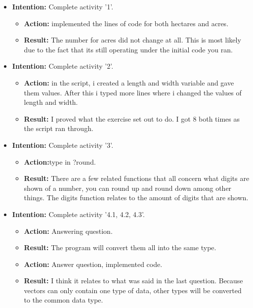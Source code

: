 \documentclass{article}
\begin{document}
\begin{itemize}
\item{\textbf{Intention:} Complete activity '1'.}

\begin{itemize}
\item{\textbf{Action:} implemented the lines of code for both hectares and acres.}
\item{\textbf{Result:} The number for acres did not change at all. This is most likely due to the fact that its still operating under the initial code you ran.}
\end{itemize}

\item{\textbf{Intention:} Complete activity '2'.}

\begin{itemize}
\item{\textbf{Action:} in the script, i created a length and width variable and gave them values. After this i typed more lines where i changed the values of length and width.}
\item{\textbf{Result:} I proved what the exercise set out to do. I got 8 both times as the script ran through.}
\end{itemize}

\item{\textbf{Intention:} Complete activity '3'.}

\begin{itemize}
\item{\textbf{Action:}type in ?round.}
\item{\textbf{Result:} There are a few related functions that all concern what digits are shown of a number, you can round up and round down among other things. The digits function relates to the amount of digits that are shown.}
\end{itemize}

\item{\textbf{Intention:} Complete activity '4.1, 4.2, 4.3'.}

\begin{itemize}
\item{\textbf{Action:} Answering question.}
\item{\textbf{Result:} The program will convert them all into the same type.}

\item{\textbf{Action:} Answer question, implemented code.}
\item{\textbf{Result:} I think it relates to what was said in the last question. Because vectors can only contain one type of data, other types will be converted to the common data type.}


\end{itemize}
\end{itemize}
\end{document}
